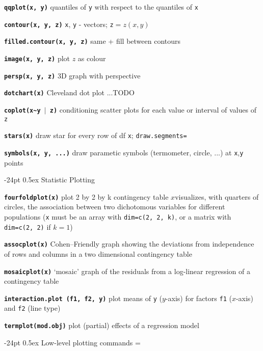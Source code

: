 \documentclass[8pt,landscape]{article}
\makeatletter
\renewcommand\section{\@startsection{section}{1}{0mm}%
                                     {-24pt}%
                                     {0.5ex}%
                                {\color{blue}\normalfont\large\bfseries}}
\newcommand{\code}{\texttt}
\newcommand{\bcode}[1]{\texttt{\textbf{#1}}}
\makeatother
\begin{document}
\begin{multicols*}{3}
\bcode{qqplot(x, y)}  quantiles of \code{y} with respect to the quantiles of \code{x}

\bcode{contour(x, y, z)}  \code{x}, \code{y} - vectors; \code{z}$=z(x,y)$

\bcode{filled.contour(x, y, z)}  same + fill between contours

\bcode{image(x, y, z)}  plot $z$ as colour

\bcode{persp(x, y, z)}  3D graph with perspective 



\bcode{dotchart(x)}  Cleveland dot plot ...TODO

\bcode{coplot(x\~{}y $\mid$ z)}  conditioning scatter plots for each value or interval of values of \code{z}

\bcode{stars(x)}  draw star for every row of df \code{x}; \code{draw.segments=}

\bcode{symbols(x, y, ...)}  draw parametic symbols (termometer, circle, ...) at \code{x},\code{y} points



\section{Statistic Plotting}


\bcode{fourfoldplot(x)}  plot 2 by 2 by k contingency table $x$visualizes, with quarters of circles, the association between two dichotomous variables for different populations (\code{x} must be an array with \code{dim=c(2, 2, k)}, or a matrix with \code{dim=c(2, 2)} if $k=1$)

\bcode{assocplot(x)}  Cohen--Friendly graph showing the deviations  from independence of rows and columns in a two dimensional contingency table

\bcode{mosaicplot(x)}  `mosaic' graph of the residuals from a log-linear regression of a contingency table

\bcode{interaction.plot (f1, f2, y)}  plot means of \code{y} ($y$-axis) for factors \code{f1} ($x$-axis) and \code{f2} (line type) 


\bcode{termplot(mod.obj)}  plot (partial) effects of a regression model

\vspace{-5ex}
\section{Low-level plotting commands}
\everypar={\hangindent=9mm}


\end{multicols*}
\end{document}
